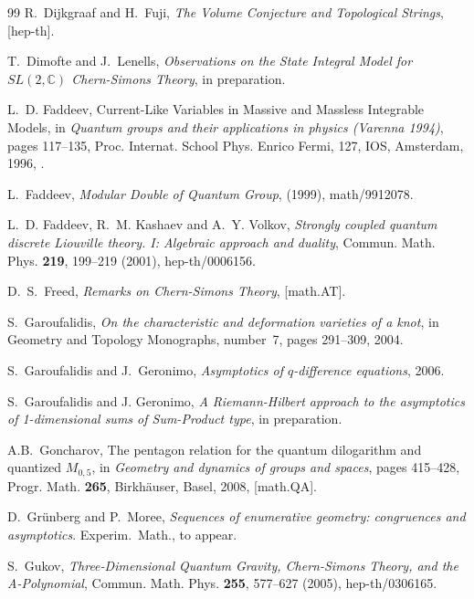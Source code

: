 \documentclass[hyper]{JHEP3}
\newcommand{\C}{{\mathbb{C}}}
\begin{document}
\begin{thebibliography}{99}
R.~Dijkgraaf and H.~Fuji,
\newblock \textsl{ The Volume Conjecture and Topological Strings},
 [hep-th].

T.~Dimofte and J.~Lenells, \textsl{ Observations on the State Integral Model for $SL(2,\C)$ Chern-Simons Theory}, 
\newblock in preparation.

L.~D. Faddeev,
\newblock Current-Like Variables in Massive and Massless Integrable Models,
\newblock in \textsl{ Quantum groups and their applications in physics (Varenna  1994)},
pages 117--135, Proc. Internat. School Phys. Enrico Fermi, 127, IOS, Amsterdam, 1996,
.

L.~Faddeev, \textsl{ Modular Double of Quantum Group},
\newblock (1999), {math/9912078}.

L.~D. Faddeev, R.~M. Kashaev and A.~Y. Volkov,
\textsl{ Strongly coupled quantum discrete Liouville theory. I: Algebraic approach and duality},
\newblock Commun. Math. Phys. \textbf{ 219}, 199--219 (2001), {hep-th/0006156}.

D.~S.~Freed, \textsl{ Remarks on Chern-Simons Theory},
 [math.AT].

S.~Garoufalidis,
\newblock \textsl{ On the characteristic and deformation varieties of a knot},
\newblock in Geometry and Topology Monographs, number~7, pages 291--309, 2004.

S.~Garoufalidis and J.~Geronimo,
\newblock \textsl{ Asymptotics of $q$-difference equations}, 2006.

S.~Garoufalidis and J. Geronimo, \newblock \textsl{ A Riemann-Hilbert approach to the asymptotics of 1-dimensional sums of Sum-Product type},
\newblock in preparation.

A.B.~Goncharov,
\newblock The pentagon relation for the quantum dilogarithm and quantized $M_{0,5}$,
\newblock in \textsl{ Geometry and dynamics of groups and spaces},
pages 415--428, Progr. Math. {\bf 265}, Birkh\"auser, Basel, 2008,
 [math.QA].

D.~Gr\"unberg and P.~Moree, \textsl{Sequences of enumerative geometry: congruences and asymptotics}.
Experim.~Math., to appear.

S.~Gukov, \textsl{ Three-Dimensional Quantum Gravity, Chern-Simons Theory, and the A-Polynomial},
\newblock Commun. Math. Phys. \textbf{ 255}, 577--627 (2005), {hep-th/0306165}.


\end{thebibliography}
\end{document}
